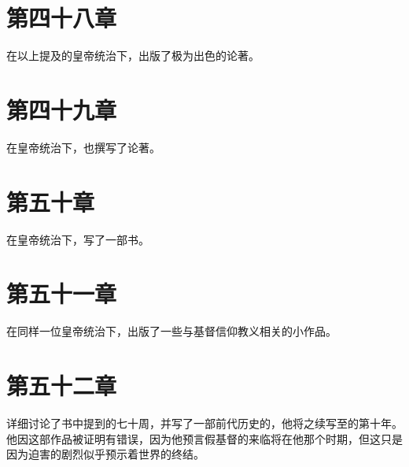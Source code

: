 
\section{第四十八章}

在以上提及的皇帝统治下，出版了极为出色的论著。\par


\section{第四十九章}

在皇帝统治下，也撰写了论著。\par


\section{第五十章}

在皇帝统治下，写了一部书。\par


\section{第五十一章}

在同样一位皇帝统治下，出版了一些与基督信仰教义相关的小作品。\par


\section{第五十二章}

详细讨论了书中提到的七十周，并写了一部前代历史的，他将之续写至的第十年。他因这部作品被证明有错误，因为他预言假基督的来临将在他那个时期，但这只是因为迫害的剧烈似乎预示着世界的终结。\par

